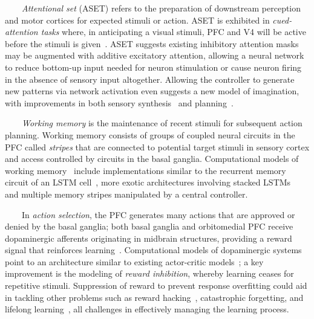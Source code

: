 \begin{center}
\begin{tcolorbox}[breakable,sharp corners=all,coltitle=black,colbacktitle=white,
    width=\textwidth,boxsep=5pt,left=5pt,right=5pt,
    title={\textbf{Box C: Hierarchy, Abstraction and Executive Control}}]
~~~~{\it{Attentional set}} (ASET) refers to the preparation of downstream perception and motor cortices for expected stimuli or action. ASET is exhibited in {\it{cued-attention tasks}} where, in anticipating a visual stimuli, PFC and V4 will be active before the stimuli is given~\cite{sylvester2009anticipatory}. ASET suggests existing inhibitory attention masks may be augmented with additive excitatory attention, allowing a neural network to reduce bottom-up input needed for neuron stimulation or cause neuron firing in the absence of sensory input altogether. Allowing the controller to generate new patterns via network activation even suggests a new model of imagination, with improvements in both sensory synthesis~\cite{GregoretalCoRR-15} and planning~\cite{PascanuetalCoRR-17}.

~~~~{\it{Working memory}} is the maintenance of recent stimuli for subsequent action planning. Working memory consists of groups of coupled neural circuits in the PFC called {\it{stripes}} that are connected to potential target stimuli in sensory cortex and access controlled by circuits in the basal ganglia. Computational models of working memory~\cite{HazyetalPTRS-07} include implementations similar to the recurrent memory circuit of an LSTM cell~\cite{HochreiterandSchmidhuberNC-97}, more exotic architectures involving stacked LSTMs~\cite{graves2013speech} and multiple memory stripes manipulated by a central controller.

~~~~In {\it{action selection}}, the PFC generates many actions that are approved or denied by the basal ganglia; both basal ganglia and orbitomedial PFC receive dopaminergic afferents originating in midbrain structures, providing a reward signal that reinforces learning~\cite{FusterPREFRONTAL-CORTEX-15}. Computational models of dopaminergic systems~\cite{o2007pvlv} point to an architecture similar to existing actor-critic models~\cite{MnihetalCoRR-16}; a key improvement is the modeling of {\it{reward inhibition}}, whereby learning ceases for repetitive stimuli. Suppression of reward to prevent response overfitting could aid in tackling other problems such as reward hacking~\cite{amodei2016concrete}, catastrophic forgetting, and lifelong learning~\cite{ZhiyuanandBingLML-18}, all challenges in effectively managing the learning process.

  \end{tcolorbox}
\end{center}
